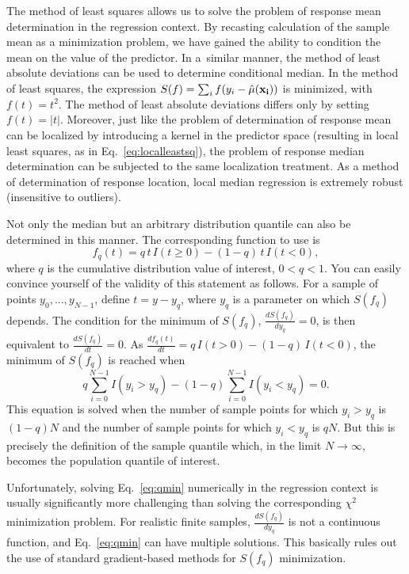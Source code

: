 \documentclass[12pt,titlepage]{article}
\begin{document}
The method of least squares allows us to solve the
problem of response mean determination in the regression
context. By recasting calculation of the sample
mean as a minimization problem, we have gained the
ability to condition the mean
on the value of the predictor. In a~similar manner,
the method of least absolute deviations can be used
to determine conditional median.
In the method of least squares,
the expression $S(f) = \sum_{i} f(y_i - \hat{\mu}({\bf x_i}))$
is minimized, with $f(t) = t^2$. The method of least absolute
deviations differs only by setting $f(t) = |t|$.
Moreover, just like the problem of determination
of response mean can be localized
by introducing a kernel in the predictor space
(resulting in local least squares, as in Eq.~\ref{eq:localleastsq}),
the problem of response median determination
can be subjected to the same localization treatment.
As a method of determination of response location,
local median regression is extremely robust (insensitive to outliers).

Not only the median but an arbitrary
distribution quantile can also be determined in this manner.
The corresponding function to use is
\begin{equation}
f_q(t) = q \,t \,I(t \ge 0) - (1 - q) \,t \,I(t < 0),
\end{equation}
where $q$ is the cumulative distribution value of interest, $0 < q < 1$.
You can easily convince yourself of the validity of this statement
as follows. For a sample of points ${y_0, ..., y_{N-1}}$,
define $t = y - y_q$, where $y_q$ is a parameter on which $S(f_q)$ depends.
The condition for the minimum of $S(f_q)$, $\frac{d S(f_q)}{d y_q} = 0$,
is then equivalent to  $\frac{d S(f_q)}{d t} = 0$. 
As $\frac{d f_q(t)}{d t} = q \,I(t > 0) - (1 - q) \,I(t < 0)$, the minimum
of $S(f_q)$ is reached when
\begin{equation}
q \sum_{i=0}^{N-1} I(y_i > y_q) - (1 - q) \sum_{i=0}^{N-1} I(y_i < y_q) = 0.
\label{eq:qmin}
\end{equation}
This equation is solved when the number of sample points for which
$y_i > y_q$ is $(1 - q) N$ and the number of sample points for which
$y_i < y_q$ is $q N$. But this is precisely the definition of
the sample quantile which, in the limit $N \rightarrow \infty$, becomes
the population quantile of interest.

Unfortunately, solving Eq.~\ref{eq:qmin} numerically
in the regression context is usually significantly more
challenging than solving the corresponding $\chi^2$ minimization
problem. For realistic finite samples, $\frac{d S(f_q)}{d y_q}$ is not
a continuous function, and Eq.~\ref{eq:qmin} can have multiple solutions.
This basically rules out the use of standard gradient-based methods
for $S(f_q)$ minimization.
\end{document}
